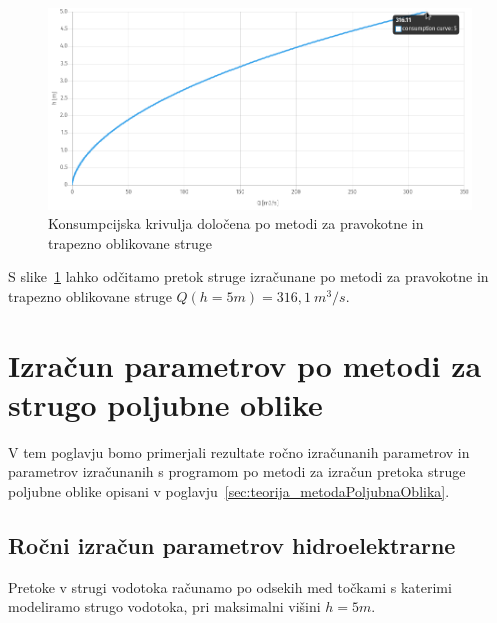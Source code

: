 \begin{figure}[H]
	\begin{centering}
		\includegraphics[width=\textwidth]{slike/izracuni/trapezna_konsumpcijska.png}\caption{Konsumpcijska krivulja določena po metodi za pravokotne in trapezno oblikovane struge}\label{fig:trapeznaMetoda_konsumpcijskaKrivulja}
	\end{centering}
\end{figure}



S slike~\ref{fig:trapeznaMetoda_konsumpcijskaKrivulja} lahko odčitamo pretok struge izračunane po metodi za pravokotne in trapezno oblikovane struge $Q(h=5m) = 316,1~m^3/s$. 


\section{Izračun parametrov po metodi za strugo poljubne oblike}\label{sec:izracun_numericnaMetoda}

V tem poglavju bomo primerjali rezultate ročno izračunanih parametrov in parametrov izračunanih s programom po metodi za izračun pretoka struge poljubne oblike opisani v poglavju~\ref{sec:teorija_metodaPoljubnaOblika}.


\subsection{Ročni izračun parametrov hidroelektrarne}\label{sec:izracun_rocno_numericnaMetoda}

Pretoke v strugi vodotoka računamo po odsekih med točkami s katerimi modeliramo strugo vodotoka, pri maksimalni višini $h=5m$.


